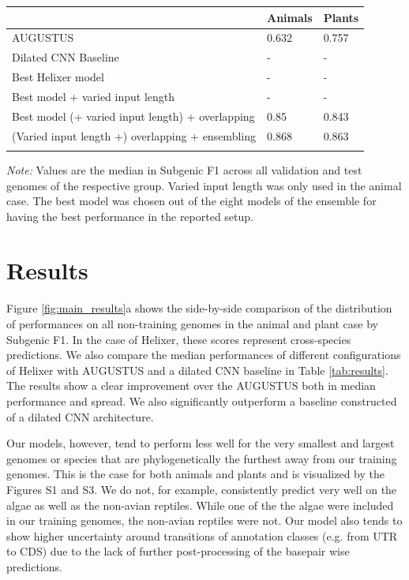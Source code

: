 \documentclass{bioinfo}
\begin{document}
\begin{table}[!t]
 {
\begin{tabular}{@{}lll@{}}
\toprule & Animals & Plants\\
\midrule
AUGUSTUS & 0.632 & 0.757 \\
Dilated CNN Baseline & -  & - \\
Best Helixer model & -  & -  \\
Best model + varied input length & -  & - \\
Best model (+ varied input length) + overlapping &  0.85  & 0.843  \\
(Varied input length +) overlapping + ensembling & 0.868  & 0.863  \\
\botrule
\end{tabular}}{{\it Note:} Values are the median in Subgenic F1 across all validation and test genomes of the respective group. Varied input length was only used in the animal case. The best model was chosen out of the eight models of the ensemble for having the best performance in the reported setup.}
\end{table}

\section{Results}
Figure \ref{fig:main_results}a shows the side-by-side comparison of the distribution of performances on all non-training genomes in the animal and plant case by Subgenic F1. In the case of Helixer, these scores represent cross-species predictions. We also compare the median performances of different configurations of Helixer with AUGUSTUS and a dilated CNN baseline in Table \ref{tab:results}. The results show a clear improvement over the AUGUSTUS both in median performance and spread. We also significantly outperform a baseline constructed of a dilated CNN architecture.

Our models, however, tend to perform less well for the very smallest and largest genomes or species that are phylogenetically the furthest away from our training genomes. This is the case for both animals and plants and is visualized by the Figures S1 and S3. We do not, for example, consistently predict very well on the algae as well as the non-avian reptiles. While one of the the algae were included in our training genomes, the non-avian reptiles were not. Our model also tends to show higher uncertainty around transitions of annotation classes (e.g. from UTR to CDS) due to the lack of further post-processing of the basepair wise predictions.
\end{document}
